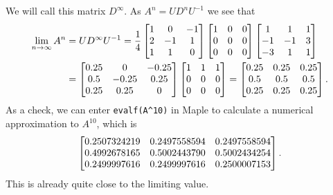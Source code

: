 \documentclass[a4paper]{amsart}
\renewenvironment{solution}{\SolutionInline}{\endSolutionInline}
\begin{document}
\begin{solution}
\[ \]
 We will call this matrix $D^\infty$. As $A^n=UD^nU^{-1}$ we see that 
 \begin{align*}
  \lim_{n\to\infty} A^n &= UD^\infty U^{-1} = 
     \frac{1}{4}
     \left[\begin{matrix} 1 & 0 & -1 \\ 2 & -1 & 1 \\ 1 & 1 & 0 \end{matrix}\right]
     \left[\begin{matrix} 1 & 0 & 0 \\ 0 & 0 & 0 \\ 0 & 0 & 0 \end{matrix}\right] 
     \left[\begin{matrix} 1&1&1 \\ -1&-1&3 \\ -3&1&1 \end{matrix}\right] \\
   &=
   \left[\begin{matrix} 0.25 & 0 & -0.25 \\ 0.5 & -0.25 & 0.25 \\ 0.25 & 0.25 & 0 \end{matrix}\right]
   \left[\begin{matrix} 1&1&1 \\ 0&0&0 \\ 0&0&0 \end{matrix}\right] = 
   \left[\begin{matrix} 0.25 & 0.25 & 0.25 \\ 0.5 & 0.5 & 0.5 \\ 0.25 & 0.25 & 0.25 \end{matrix}\right].
 \end{align*}
 As a check, we can enter \verb+evalf(A^10)+ in Maple to calculate a
 numerical approximation to $A^{10}$, which is
 \[ \left[\begin{matrix} 0.2507324219 & 0.2497558594 & 0.2497558594 \\
         0.4992678165 & 0.5002443790 & 0.5002434254 \\
         0.2499997616 & 0.2499997616 & 0.2500007153 \end{matrix}\right].
 \]
 This is already quite close to the limiting value.
\end{solution}
\end{document}
